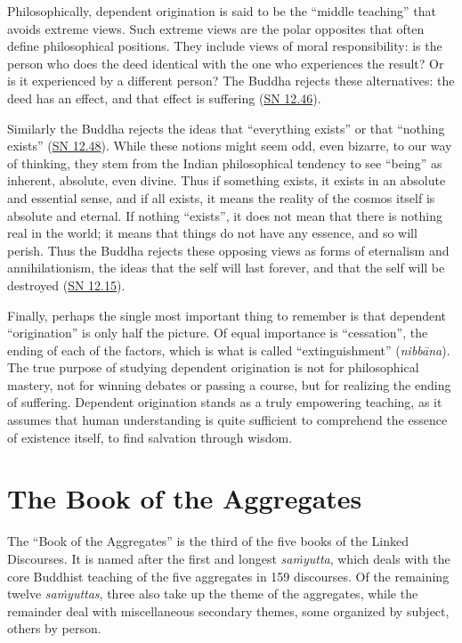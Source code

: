 \documentclass[12pt,openany]{book}%
\begin{document}
Philosophically, dependent origination is said to be the “middle teaching” that avoids extreme views. Such extreme views are the polar opposites that often define philosophical positions. They include views of moral responsibility: is the person who does the deed identical with the one who experiences the result? Or is it experienced by a different person? The Buddha rejects these alternatives: the deed has an effect, and that effect is suffering (\href{https://suttacentral.net/sn12.46}{SN 12.46}).

Similarly the Buddha rejects the ideas that “everything exists” or that “nothing exists” (\href{https://suttacentral.net/sn12.48}{SN 12.48}). While these notions might seem odd, even bizarre, to our way of thinking, they stem from the Indian philosophical tendency to see “being” as inherent, absolute, even divine. Thus if something exists, it exists in an absolute and essential sense, and if all exists, it means the reality of the cosmos itself is absolute and eternal. If nothing “exists”, it does not mean that there is nothing real in the world; it means that things do not have any essence, and so will perish. Thus the Buddha rejects these opposing views as forms of eternalism and annihilationism, the ideas that the self will last forever, and that the self will be destroyed (\href{https://suttacentral.net/sn12.15}{SN 12.15}).

Finally, perhaps the single most important thing to remember is that dependent “origination” is only half the picture. Of equal importance is “cessation”, the ending of each of the factors, which is what is called “extinguishment” (\textit{\textsanskrit{nibbāna}}). The true purpose of studying dependent origination is not for philosophical mastery, not for winning debates or passing a course, but for realizing the ending of suffering. Dependent origination stands as a truly empowering teaching, as it assumes that human understanding is quite sufficient to comprehend the essence of existence itself, to find salvation through wisdom.

\section*{The Book of the Aggregates}

The “Book of the Aggregates” is the third of the five books of the Linked Discourses. It is named after the first and longest \textit{\textsanskrit{saṁyutta}}, which deals with the core Buddhist teaching of the five aggregates in 159 discourses. Of the remaining twelve \textit{\textsanskrit{saṁyuttas}}, three also take up the theme of the aggregates, while the remainder deal with miscellaneous secondary themes, some organized by subject, others by person.
\end{document}
